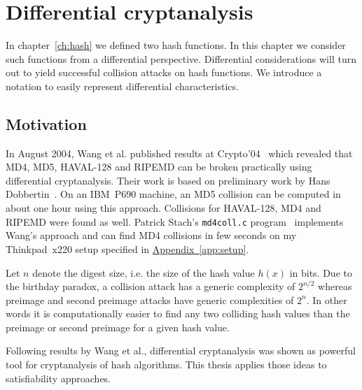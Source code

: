 \renewcommand*\chappic{img/diff-crypt.pdf}
\renewcommand*\chapquote{Just because it's automatic doesn't mean it works.}
\renewcommand*\chapquotesrc{Daniel J. Bernstein}
%
\chapter{Differential cryptanalysis}
\label{ch:dc}
%
In chapter~\ref{ch:hash} we defined two hash functions. In this chapter
we consider such functions from a differential perspective. Differential
considerations will turn out to yield successful collision attacks on hash
functions. We introduce a notation to easily represent differential
characteristics.

\section{Motivation}
\label{sec:dc-motivation}
%
In August 2004, Wang et al. published results at Crypto'04~\cite{wang2004} which revealed
that MD4, MD5, HAVAL-128 and RIPEMD can be broken practically using differential cryptanalysis.
Their work is based on preliminary work by Hans Dobbertin~\cite{Dobbertin1998}.
On an IBM~P690 machine, an MD5 collision can be computed in about one hour using this approach.
Collisions for HAVAL-128, MD4 and RIPEMD were found as well. Patrick Stach's \texttt{md4coll.c}
program~\cite{md4coll} implements Wang's approach and can find MD4 collisions in few seconds
on my Thinkpad~x220 setup specified in \hyperref[app:setup]{Appendix~\ref{app:setup}}.

Let $n$ denote the digest size, i.e. the size of the hash value $h(x)$ in bits.
Due to the birthday paradox, a collision attack has a generic complexity of $2^{n/2}$
whereas preimage and second preimage attacks have generic complexities of $2^n$.
In other words it is computationally easier to find any two colliding hash values
than the preimage or second preimage for a given hash value.

Following results by Wang et al., differential cryptanalysis was shown as
powerful tool for cryptanalysis of hash algorithms. This thesis applies those
ideas to satisfiability approaches.

